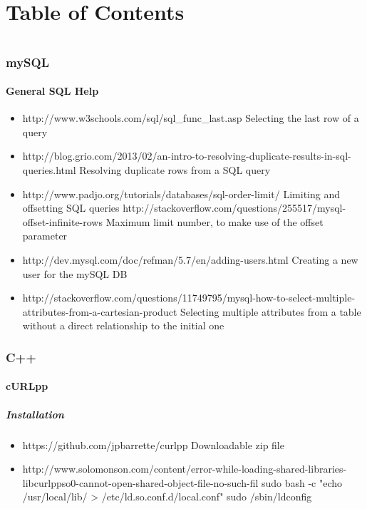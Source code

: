 \documentclass[12pt]{article}
\begin{document}
\part*{Table of Contents}
\tableofcontents
\pagebreak
\part*{}
\section{mySQL}
	\subsection{General SQL Help}
		\begin{itemize}
			\item http://www.w3schools.com/sql/sql\_func\_last.asp
			\subitem Selecting the last row of a query
			\item http://blog.grio.com/2013/02/an-intro-to-resolving-duplicate-results-in-sql-queries.html
			\subitem Resolving duplicate rows from a SQL query
			\item http://www.padjo.org/tutorials/databases/sql-order-limit/
			\subitem Limiting and offsetting SQL queries
			\subitem http://stackoverflow.com/questions/255517/mysql-offset-infinite-rows
			\subsubitem Maximum limit number, to make use of the offset parameter
			\item http://dev.mysql.com/doc/refman/5.7/en/adding-users.html
			\subitem Creating a new user for the mySQL DB
			\item http://stackoverflow.com/questions/11749795/mysql-how-to-select-multiple-attributes-from-a-cartesian-product
			\subitem Selecting multiple attributes from a table without a direct relationship to the initial one
		\end{itemize}
\section{C++}
	\subsection{cURLpp}
	\subsubsection{Installation}
	\begin{itemize}
		\item https://github.com/jpbarrette/curlpp
		\subitem Downloadable zip file
		\item http://www.solomonson.com/content/error-while-loading-shared-libraries-libcurlppso0-cannot-open-shared-object-file-no-such-fil
		\subitem sudo bash -c "echo /usr/local/lib/ > /etc/ld.so.conf.d/local.conf"
		\subitem sudo /sbin/ldconfig
		\end{itemize}
\end{document}
